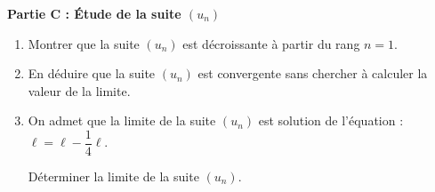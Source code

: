 \documentclass[10pt]{article}
\begin{document}
\medskip

\textbf{Partie C : Étude de la suite \boldmath$\left(u_{n}\right)$\unboldmath}

\medskip

\begin{enumerate}
\item Montrer que la suite $\left(u_{n}\right)$ est décroissante à partir du rang $n = 1$.
\item En déduire que la suite $\left(u_{n}\right)$ est convergente sans chercher à calculer la valeur de la limite.
\item On admet que la limite de la suite $\left(u_{n}\right)$ est solution de l'équation : $\ell=\ell-\dfrac{1}{4} \ell$.

Déterminer la limite de la suite $\left(u_{n}\right)$.
\end{enumerate}
\end{document}
